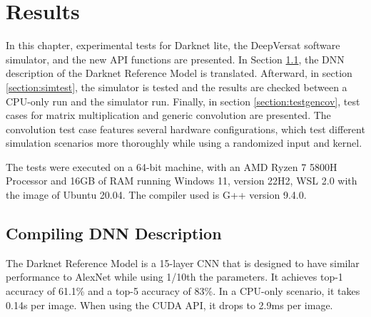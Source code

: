 
\chapter{Results}
\label{chapter:results}

In this chapter, experimental tests for Darknet lite, the DeepVersat software simulator, and the new API functions are presented.
In Section \ref{section:DNNDescription}, the DNN description of the Darknet Reference Model is translated. 
Afterward, in section \ref{section:simtest}, the simulator is tested and the results are checked between a CPU-only run and the simulator run. 
Finally, in section \ref{section:testgencov}, test cases for matrix
multiplication and generic convolution are presented. The convolution test case
features several hardware configurations, which test different simulation
scenarios more thoroughly while using a randomized input and kernel. 

The tests were executed on a 64-bit machine, with an AMD Ryzen 7 5800H Processor
and 16GB of RAM running Windows 11, version 22H2, WSL 2.0 with the image of
Ubuntu 20.04. The compiler used is G++ version 9.4.0.



\section{Compiling DNN Description}
\label{section:DNNDescription}

The Darknet Reference Model is a 15-layer CNN that is designed to have similar performance to AlexNet\cite{alexnet} while using 1/10th the parameters. 
It achieves top-1 accuracy of 61.1\% and a top-5 accuracy of 83\%. In a CPU-only scenario, it takes 0.14s per image. When using the CUDA API, it drops to 2.9ms per image.

